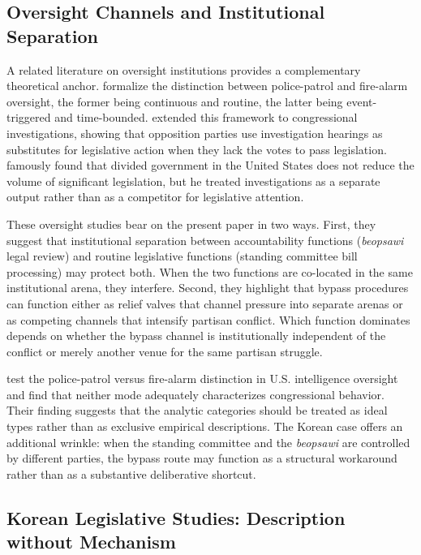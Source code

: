 \documentclass[11pt]{article}
\begin{document}
\subsection{Oversight Channels and Institutional Separation}

A related literature on oversight institutions provides a complementary theoretical anchor. \citet{mccubbins1989} formalize the distinction between police-patrol and fire-alarm oversight, the former being continuous and routine, the latter being event-triggered and time-bounded. \citet{kriner2008} extended this framework to congressional investigations, showing that opposition parties use investigation hearings as substitutes for legislative action when they lack the votes to pass legislation. \citet{mayhew1991} famously found that divided government in the United States does not reduce the volume of significant legislation, but he treated investigations as a separate output rather than as a competitor for legislative attention.

These oversight studies bear on the present paper in two ways. First, they suggest that institutional separation between accountability functions (\textit{beopsawi} legal review) and routine legislative functions (standing committee bill processing) may protect both. When the two functions are co-located in the same institutional arena, they interfere. Second, they highlight that bypass procedures can function either as relief valves that channel pressure into separate arenas or as competing channels that intensify partisan conflict. Which function dominates depends on whether the bypass channel is institutionally independent of the conflict or merely another venue for the same partisan struggle.

\citet{zegart2010} test the police-patrol versus fire-alarm distinction in U.S. intelligence oversight and find that neither mode adequately characterizes congressional behavior. Their finding suggests that the analytic categories should be treated as ideal types rather than as exclusive empirical descriptions. The Korean case offers an additional wrinkle: when the standing committee and the \textit{beopsawi} are controlled by different parties, the bypass route may function as a structural workaround rather than as a substantive deliberative shortcut.

\subsection{Korean Legislative Studies: Description without Mechanism}
\end{document}
